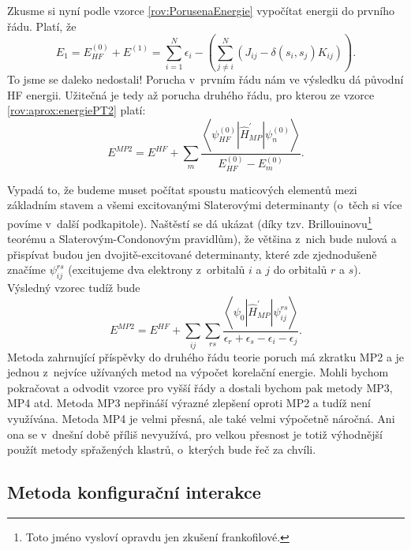 Zkusme si nyní podle vzorce \eqref{rov:PorusenaEnergie} vypočítat energii do prvního řádu. Platí, že
\begin{equation}
E_1=E^{(0)}_{HF} + E^{(1)}= \sum_{i=1}^N \epsilon_i - \left(\sum_{j\neq i}^{N} \left( J_{ij} - \delta(s_i,s_j) {K}_{ij} \right) \right).
\end{equation}
To jsme se daleko nedostali! Porucha v~prvním řádu nám ve výsledku dá původní HF energii.
Užitečná je tedy až porucha druhého řádu, pro kterou ze vzorce \eqref{rov:aprox:energiePT2} platí:
\begin{equation}
E^{MP2} = E^{HF} + \sum_m \frac{\left < \psi^{(0)}_{HF}|\hat{H}^{\prime}_{MP}|\psi_n^{(0)} \right >}{E_{HF}^{(0)}-E_m^{(0)}}.
\end{equation}

Vypadá to, že budeme muset počítat spoustu maticových elementů mezi základním stavem a všemi excitovanými Slaterovými determinanty (o~těch si více povíme v~další podkapitole). Naštěstí se dá ukázat (díky tzv. Brillouinovu\footnote{Toto jméno vysloví opravdu jen zkušení frankofilové.} teorému a Slaterovým-Condonovým pravidlům), že většina z~nich bude nulová a přispívat budou jen dvojitě-excitované determinanty, které zde zjednodušeně značíme $\psi_{ij}^{rs}$ (excitujeme dva elektrony z~orbitalů $i$ a $j$ do orbitalů $r$ a $s$). Výsledný vzorec tudíž bude
\begin{equation}
E^{MP2}= E^{HF} + \sum_{ij} \sum_{rs} \frac{\left < \psi_0 | \hat{H}^{\prime}_{MP} | \psi_{ij}^{rs} \right > }{\epsilon_r+\epsilon_s-\epsilon_i-\epsilon_j} .
\end{equation}
Metoda zahrnující příspěvky do druhého řádu teorie poruch má zkratku MP2 a je jednou z~nejvíce užívaných metod na výpočet korelační energie. Mohli bychom pokračovat a odvodit vzorce pro vyšší řády a dostali bychom pak metody MP3, MP4 atd. 
Metoda MP3 nepřináší výrazné zlepšení oproti MP2 a tudíž není využívána. Metoda MP4 je velmi přesná, ale také velmi výpočetně náročná. Ani ona se v~dnešní době příliš nevyužívá, pro velkou přesnost je totiž výhodnější použít metody spřažených klastrů, o~kterých bude řeč za chvíli.


\subsection{Metoda konfigurační interakce}

